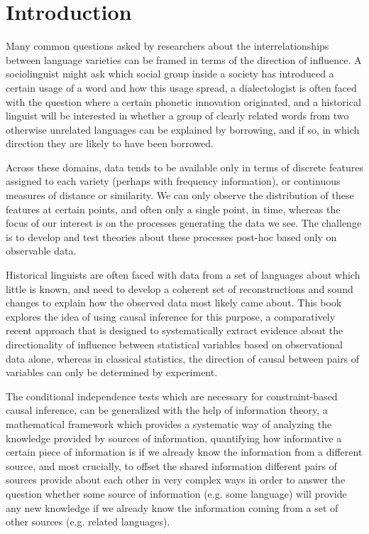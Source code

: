 \chapter{Introduction}
Many common questions asked by researchers about the interrelationships between language varieties can be framed in terms of the direction of influence. A sociolinguist might ask which social group inside a society has introduced a certain usage of a word and how this usage spread, a dialectologist is often faced with the question where a certain phonetic innovation originated, and a historical linguist will be interested in whether a group of clearly related words from two otherwise unrelated languages can be explained by borrowing, and if so, in which direction they are likely to have been borrowed.

Across these domains, data tends to be available only in terms of discrete features assigned to each variety (perhaps with frequency information), or continuous measures of distance or similarity. We can only observe the distribution of these features at certain points, and often only a single point, in time, whereas the focus of our interest is on the processes generating the data we see. The challenge is to develop and test theories about these processes post-hoc based only on observable data. 

Historical linguists are often faced with data from a set of languages about which little is known, and need to develop a coherent set of reconstructions and sound changes to explain how the observed data most likely came about. This book explores the idea of using causal inference for this purpose, a comparatively recent approach that is designed to systematically extract evidence about the directionality of influence between statistical variables based on observational data alone, whereas in classical statistics, the direction of causal between pairs of variables can only be determined by experiment.

The conditional independence tests which are necessary for constraint-based causal inference, can be generalized with the help of information theory, a mathematical framework which provides a systematic way of analyzing the knowledge provided by sources of information, quantifying how informative a certain piece of information is if we already know the information from a different source, and most crucially, to offset the shared information different pairs of sources provide about each other in very complex ways in order to answer the question whether some source of information (e.g. some language) will provide any new knowledge if we already know the information coming from a set of other sources (e.g. related languages).

